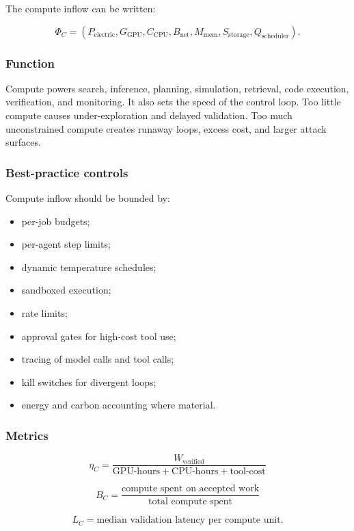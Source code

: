 \documentclass[
  11pt,
]{article}
\providecommand{\tightlist}{%
  \setlength{\itemsep}{0pt}\setlength{\parskip}{0pt}}
\begin{document}
The compute inflow can be written:

\[
\Phi_C=(P_{\text{electric}},G_{\text{GPU}},C_{\text{CPU}},B_{\text{net}},M_{\text{mem}},S_{\text{storage}},Q_{\text{scheduler}}).
\]

\subsubsection{Function}\label{function}

Compute powers search, inference, planning, simulation, retrieval, code
execution, verification, and monitoring. It also sets the speed of the
control loop. Too little compute causes under-exploration and delayed
validation. Too much unconstrained compute creates runaway loops, excess
cost, and larger attack surfaces.

\subsubsection{Best-practice controls}\label{best-practice-controls}

Compute inflow should be bounded by:

\begin{itemize}
\tightlist
\item
  per-job budgets;
\item
  per-agent step limits;
\item
  dynamic temperature schedules;
\item
  sandboxed execution;
\item
  rate limits;
\item
  approval gates for high-cost tool use;
\item
  tracing of model calls and tool calls;
\item
  kill switches for divergent loops;
\item
  energy and carbon accounting where material.
\end{itemize}

\subsubsection{Metrics}\label{metrics}

\[
\eta_C=\frac{W_{\text{verified}}}{\text{GPU-hours}+\text{CPU-hours}+\text{tool-cost}}
\]

\[
B_C=\frac{\text{compute spent on accepted work}}{\text{total compute spent}}
\]

\[
L_C=\text{median validation latency per compute unit}.
\]
\end{document}

